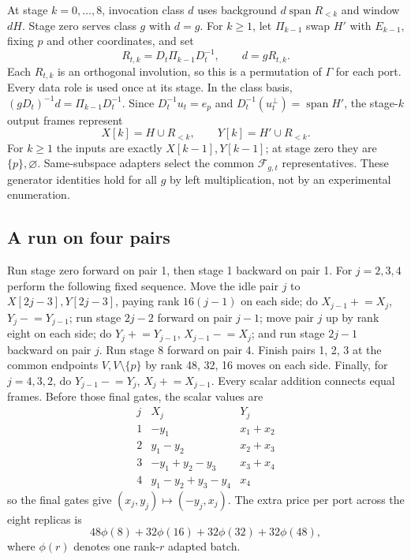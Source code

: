 \documentclass[11pt]{amsart}
\theoremstyle{remark}
\newcommand{\Span}{\operatorname{span}}
\begin{document}
At stage $k=0,\ldots,8$, invocation class $d$ uses background
$d\Span R_{<k}$ and window $dH$. Stage zero serves class $g$ with
$d=g$. For $k\ge1$, let $\Pi_{k-1}$ swap $H'$ with $E_{k-1}$, fixing
$p$ and other coordinates, and set
\[
 R_{t,k}=D_t\Pi_{k-1}D_t^{-1},\qquad d=gR_{t,k}.
\]
Each $R_{t,k}$ is an orthogonal involution, so this is a permutation
of $\Gamma$ for each port. Every data role is used once at its stage.
In the class basis, $(gD_t)^{-1}d=\Pi_{k-1}D_t^{-1}$. Since
$D_t^{-1}u_t=e_p$ and $D_t^{-1}(u_t^\perp)=\Span H'$, the stage-$k$
output frames represent
\[
 X[k]=H\cup R_{<k},\qquad Y[k]=H'\cup R_{<k}.
\]
For $k\ge1$ the inputs are exactly $X[k-1],Y[k-1]$; at stage zero
they are $\{p\},\varnothing$. Same-subspace adapters select the common
$\mathcal F_{g,t}$ representatives. These generator identities hold for
all $g$ by left multiplication, not by an experimental enumeration.

\subsection{A run on four pairs}
Run stage zero forward on pair 1, then stage 1 backward on pair 1.
For $j=2,3,4$ perform the following fixed sequence. Move the idle pair
$j$ to $X[2j-3],Y[2j-3]$, paying rank $16(j-1)$ on each side; do
$X_{j-1}\mathrel{+}=X_j$, $Y_j\mathrel{-}=Y_{j-1}$; run stage $2j-2$
forward on pair $j-1$; move pair $j$ up by rank eight on each side;
do $Y_j\mathrel{+}=Y_{j-1}$, $X_{j-1}\mathrel{-}=X_j$; and run stage
$2j-1$ backward on pair $j$. Run stage 8 forward on pair 4.
Finish pairs 1, 2, 3 at the common endpoints $V,V\setminus\{p\}$ by
rank 48, 32, 16 moves on each side. Finally, for $j=4,3,2$, do
$Y_{j-1}\mathrel{-}=Y_j$, $X_j\mathrel{+}=X_{j-1}$.
Every scalar addition connects equal frames. Before those final gates,
the scalar values are
\[
\begin{array}{c|cc}
j&X_j&Y_j\\\hline
1&-y_1&x_1+x_2\\
2&y_1-y_2&x_2+x_3\\
3&-y_1+y_2-y_3&x_3+x_4\\
4&y_1-y_2+y_3-y_4&x_4
\end{array}
\]
so the final gates give $(x_j,y_j)\mapsto(-y_j,x_j)$.
The extra price per port across the eight replicas is
\begin{equation}\label{eq:extra}
 48\phi(8)+32\phi(16)+32\phi(32)+32\phi(48),
\end{equation}
where $\phi(r)$ denotes one rank-$r$ adapted batch.
\end{document}
